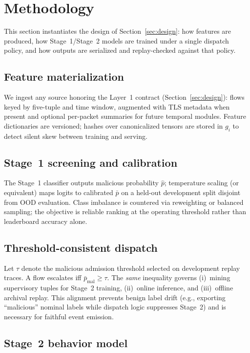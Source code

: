 \section{Methodology}
\label{sec:method}

This section instantiates the design of Section~\ref{sec:design}: how features are produced, how Stage~1/Stage~2 models are trained under a single dispatch policy, and how outputs are serialized and replay-checked against that policy.

\subsection{Feature materialization}

We ingest any source honoring the Layer~1 contract (Section~\ref{sec:design}): flows keyed by five-tuple and time window, augmented with TLS metadata when present and optional per-packet summaries for future temporal modules.
Feature dictionaries are versioned; hashes over canonicalized tensors are stored in $g_i$ to detect silent skew between training and serving.

\subsection{Stage~1 screening and calibration}

The Stage~1 classifier outputs malicious probability $\hat{p}$; temperature scaling (or equivalent) maps logits to calibrated $\bar{p}$ on a held-out development split disjoint from OOD evaluation.
Class imbalance is countered via reweighting or balanced sampling; the objective is reliable ranking at the operating threshold rather than leaderboard accuracy alone.

\subsection{Threshold-consistent dispatch}

Let $\tau$ denote the malicious admission threshold selected on development replay traces.
A flow escalates iff $\bar{p}_{\mathrm{mal}} \ge \tau$.
The \emph{same} inequality governs (i)~mining supervisory tuples for Stage~2 training, (ii)~online inference, and (iii)~offline archival replay.
This alignment prevents benign label drift (e.g., exporting ``malicious'' nominal labels while dispatch logic suppresses Stage~2) and is necessary for faithful event emission.

\subsection{Stage~2 behavior model}

